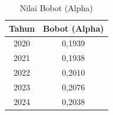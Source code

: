 \begin{table}[H]
\centering
\caption{Nilai Bobot (Alpha)} \label{tab:alpha}
\begin{tabular}{|c|c|}
\hline
\textbf{Tahun} & \textbf{Bobot (Alpha)} \\
\hline
2020 & 0,1939 \\
2021 & 0,1938 \\
2022 & 0,2010 \\
2023 & 0,2076 \\
2024 & 0,2038 \\
\hline
\end{tabular}
\end{table}